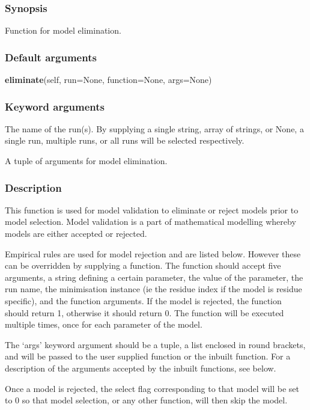 \subsubsection{Synopsis}

Function for model elimination.

\subsubsection{Default arguments}

\textsf{\textbf{eliminate}(self, run=None, function=None, args=None)}


\subsubsection{Keyword arguments}

  The name of the run(s).  By supplying a single string, array of strings, or None, a single run, multiple runs, or all runs will be selected respectively.

  A tuple of arguments for model elimination.

\subsubsection{Description}

This function is used for model validation to eliminate or reject models prior to model
selection.  Model validation is a part of mathematical modelling whereby models are either
accepted or rejected.

Empirical rules are used for model rejection and are listed below.  However these can be
overridden by supplying a function.  The function should accept five arguments, a string
defining a certain parameter, the value of the parameter, the run name, the minimisation
instance (ie the residue index if the model is residue specific), and the function
arguments.  If the model is rejected, the function should return 1, otherwise it should
return 0.  The function will be executed multiple times, once for each parameter of the
model.

The `args' keyword argument should be a tuple, a list enclosed in round brackets, and will
be passed to the user supplied function or the inbuilt function.  For a description of the
arguments accepted by the inbuilt functions, see below.

Once a model is rejected, the select flag corresponding to that model will be set to 0 so
that model selection, or any other function, will then skip the model.



